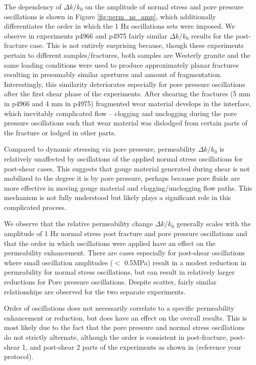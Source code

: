 \documentclass[letterpaper,10pt]{article}
\begin{document}
The dependency of $ \Delta k/k_0 $ on the amplitude of normal stress and pore pressure oscillations is shown in Figure \ref{fig:perm_ns_amp}, which additionally differentiates the order in which the 1 Hz oscillations sets were imposed. We observe in experiments p4966 and p4975 fairly similar $ \Delta k/k_0 $ results for the post-fracture case. This is not entirely surprising because, though these experiments pertain to different samples/fractures, both samples are Westerly granite and the same loading conditions were used to produce approximately planar fractures resulting in presumably similar apertures and amount of fragmentation. Interestingly, this similarity deteriorates especially for pore pressure oscillations after the first shear phase of the experiments. After shearing the fractures (5 mm in p4966 and 4 mm in p4975) fragmented wear material develops in the interface, which inevitably complicated flow -- clogging and unclogging during the pore pressure oscillations such that wear material was dislodged from certain parts of the fracture or lodged in other parts.

Compared to dynamic stressing via pore pressure, permeability $ \Delta k/k_0 $ is relatively unaffected by oscillations of the applied normal stress oscillations for post-shear cases. This suggests that gouge material generated during shear is not mobilized to the degree it is by pore pressure, perhaps because pore fluids are more effective in moving gouge material and clogging/unclogging flow paths. This mechanism is not fully understood but likely plays a significant role in this complicated process.

We observe that the relative permeability change $ \Delta k/k_0 $ generally scales with the amplitude of 1 Hz normal stress post fracture and pore pressure oscillations and that the order in which oscillations were applied have an effect on the permeability enhancement. There are cases especially for post-shear oscillations where small oscillation amplitudes ($< $ 0.5MPa) result in a modest reduction in permeability for normal stress oscillations, but can result in relatively larger reductions for Pore pressure oscillations. Despite scatter, fairly similar relationships are observed for the two separate experiments.

Order of oscillations does not necessarily correlate to a specific permeability enhancement or reduction, but does have an effect on the overall results. This is most likely due to the fact that the pore pressure and normal stress oscillations do not strictly alternate, although the order is consistent in post-fracture, post-shear 1, and post-shear 2 parts of the experiments as shown in (reference your protocol).
\end{document}
